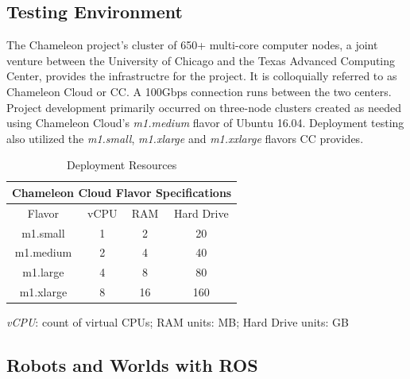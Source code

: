 \documentclass[9pt,twocolumn,twoside]{../../styles/osajnl}
\begin{document}
\subsection{Testing Environment}
The Chameleon project's cluster of 650+ multi-core computer nodes, a joint venture between the University of Chicago and the Texas Advanced Computing Center, provides the infrastructre for the project.  It is colloquially referred to as Chameleon Cloud or CC.  A 100Gbps connection runs between the two centers. Project development primarily occurred on three-node clusters created as needed using Chameleon Cloud's \textit{m1.medium} flavor of Ubuntu 16.04.  Deployment testing also utilized the \textit{m1.small}, \textit{m1.xlarge} and \textit{m1.xxlarge} flavors CC provides.  

\begin{table} [htbp]
  \begin{threeparttable}
  \centering
  \caption{Deployment Resources}
    \begin{tabular}{cccc}
      \multicolumn{4}{c}{\bf Chameleon Cloud Flavor Specifications}\\ \hline Flavor & vCPU & RAM & Hard Drive \\ \hline m1.small & 1 & 2 & 20\\ m1.medium & 2 & 4 & 40\\ m1.large & 4 & 8 & 80 \\ m1.xlarge & 8 & 16 & 160 \\ \hline
    \end{tabular}
    \begin{tablenotes}
      \small
      \item \textit{vCPU}: count of virtual CPUs; RAM units: MB; Hard Drive units: GB 
    \end{tablenotes}
  \end{threeparttable}
\end{table}

\subsection{Robots and Worlds with ROS}
\end{document}
